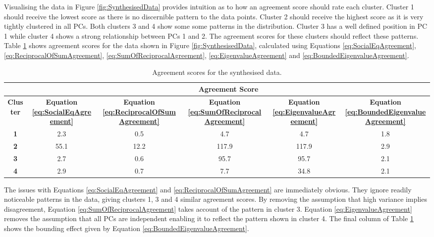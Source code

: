 			Visualising the data in Figure \ref{fig:SynthesisedData} provides intuition as to how an agreement
			score should rate each cluster. Cluster 1 should receive the lowest score as there is no
			discernible pattern to the data points. Cluster 2 should receive the highest score as it is very
			tightly clustered in all PCs. Both clusters 3 and 4 show some some patterns in the distribution.
			Cluster 3 has a well defined position in PC 1 while cluster 4 shows a strong relationship between
			PCs 1 and 2. The agreement scores for these clusters should reflect these patterns. Table
			\ref{tab:SynthesisedDataAgreement} shows agreement scores for the data shown in Figure
			\ref{fig:SynthesisedData}, calculated using Equations \ref{eq:SocialEqAgreement},
			\ref{eq:ReciprocalOfSumAgreement}, \ref{eq:SumOfReciprocalAgreement}, \ref{eq:EigenvalueAgreement}
			and \ref{eq:BoundedEigenvalueAgreement}.

			\begin{table}[h!]
				\centering
				\begin{tabular}{|c|c|c|c|c|c|}
					\cline{2-6}
					\multicolumn{1}{c|}{} & \multicolumn{5}{c|}{\bf{Agreement Score}} \tabularnewline
					\hline
					\bf{Cluster} & \bf{Equation \ref{eq:SocialEqAgreement}} & 
					\bf{Equation \ref{eq:ReciprocalOfSumAgreement}} &
					\bf{Equation \ref{eq:SumOfReciprocalAgreement}} & 
					\bf{Equation \ref{eq:EigenvalueAgreement}} &
					\bf{Equation \ref{eq:BoundedEigenvalueAgreement}} \tabularnewline
					\hline
					\hline
					\bf{1} & 2.3 & 0.5 & 4.7 & 4.7 & 1.8 \tabularnewline
					\hline
					\bf{2} & 55.1 & 12.2 & 117.9 & 117.9 & 2.9 \tabularnewline
					\hline
					\bf{3} & 2.7 & 0.6 & 95.7 & 95.7 & 2.1 \tabularnewline
					\hline
					\bf{4} & 2.9 & 0.7 & 7.7 & 34.8 & 2.1 \tabularnewline
					\hline
				\end{tabular}
				\caption{Agreement scores for the synthesised data.}
				\label{tab:SynthesisedDataAgreement}
			\end{table}

			The issues with Equations \ref{eq:SocialEqAgreement} and \ref{eq:ReciprocalOfSumAgreement} are
			immediately obvious. They ignore readily noticeable patterns in the data, giving clusters 1, 3 and
			4 similar agreement scores. By removing the assumption that high variance implies disagreement,
			Equation \ref{eq:SumOfReciprocalAgreement} takes account of the pattern in cluster 3. Equation
			\ref{eq:EigenvalueAgreement} removes the assumption that all PCs are independent enabling it to
			reflect the pattern shown in cluster 4. The final column of Table
			\ref{tab:SynthesisedDataAgreement} shows the bounding effect given by Equation
			\ref{eq:BoundedEigenvalueAgreement}.


